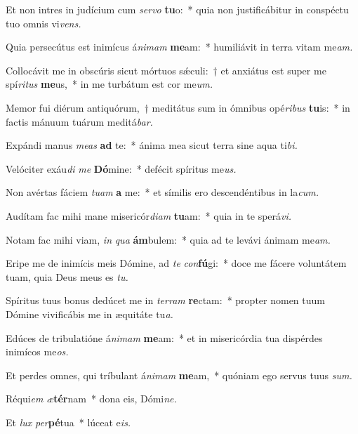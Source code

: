 \item Et non intres in judícium cum \textit{servo} \textbf{tu}o:~* quia non justificábitur in conspéctu tuo o\-mnis vi\textit{vens.}
\item Quia persecútus est inimícus á\textit{nimam} \textbf{me}am:~* humiliávit in terra vitam me\textit{am.}
\item Collocávit me in obscúris sicut mórtuos sǽculi:~† et anxiátus est super me spí\textit{ritus} \textbf{me}us,~* in me turbátum est cor me\textit{um.}
\item Memor fui diérum antiquórum,~† meditátus sum in ómnibus opé\textit{ribus} \textbf{tu}is:~* in factis mánuum tuárum meditá\textit{bar.}
\item Expándi manus \textit{meas} \textbf{ad} te:~* ánima mea sicut terra sine aqua ti\textit{bi.}
\item Velóciter exáu\textit{di} \textit{me} \textbf{Dó}mine:~* defécit spíritus me\textit{us.}
\item Non avértas fáciem \textit{tuam} \textbf{a} me:~* et símilis ero descendéntibus in la\textit{cum.}
\item Audítam fac mihi mane misericór\textit{diam} \textbf{tu}am:~* quia in te sperá\textit{vi.}
\item Notam fac mihi viam, \textit{in} \textit{qua} \textbf{ám}bulem:~* quia ad te levávi ánimam me\textit{am.}
\item Eripe me de inimícis meis Dómine, ad \textit{te} \textit{con}\textbf{fú}gi:~* doce me fácere voluntátem tuam, quia Deus meus es \textit{tu.}
\item Spíritus tuus bonus dedúcet me in \textit{terram} \textbf{re}ctam:~* propter nomen tuum Dómine vivificábis me in æquitáte tu\textit{a.}
\item Edúces de tribulatióne á\textit{nimam} \textbf{me}am:~* et in misericórdia tua dispérdes inimícos me\textit{os.}
\item Et perdes omnes, qui tríbulant á\textit{nimam} \textbf{me}am,~* quóniam ego servus tuus \textit{sum.}
\item Réqui\textit{em} \textit{æ}\textbf{tér}nam~* dona eis, Dómi\textit{ne.}
\item Et \textit{lux} \textit{per}\textbf{pé}tua~* lúceat e\textit{is.}